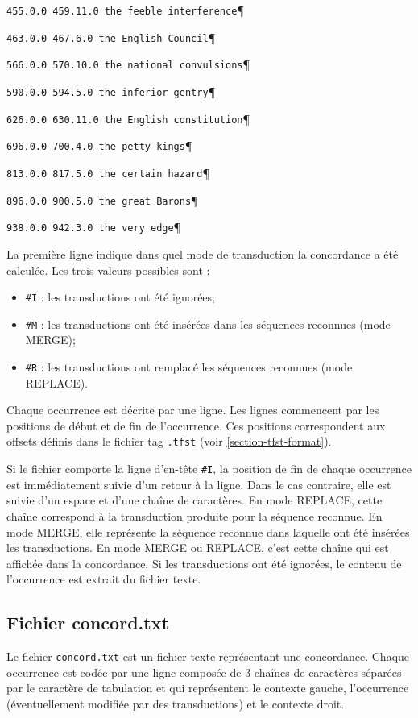 \verb$455.0.0 459.11.0 the feeble interference$\P

\verb$463.0.0 467.6.0 the English Council$\P

\verb$566.0.0 570.10.0 the national convulsions$\P

\verb$590.0.0 594.5.0 the inferior gentry$\P

\verb$626.0.0 630.11.0 the English constitution$\P

\verb$696.0.0 700.4.0 the petty kings$\P

\verb$813.0.0 817.5.0 the certain hazard$\P

\verb$896.0.0 900.5.0 the great Barons$\P

\verb$938.0.0 942.3.0 the very edge$\P

\bigskip
\noindent La première ligne indique dans quel mode de transduction la concordance a été calculée.
Les trois valeurs possibles sont :

\begin{itemize}
  \item \verb+#I+ : les transductions ont été ignorées;

  \item \verb+#M+ : les transductions ont été insérées dans les séquences reconnues (mode MERGE);
  
  \item \verb+#R+ : les transductions ont remplacé les séquences reconnues (mode REPLACE).
\end{itemize}

\bigskip
\noindent Chaque occurrence est décrite par une ligne. Les lignes commencent par les positions de
début et de fin de l’occurrence. Ces positions correspondent aux offsets
définis dans le fichier tag \verb$.tfst$  (voir \ref{section-tfst-format}).

\bigskip
\noindent Si le fichier comporte la ligne d’en-tête \verb+#I+, la position de fin de chaque
occurrence est immédiatement suivie d’un retour à la ligne. Dans le cas contraire, elle est suivie
d’un espace et d’une chaîne de caractères. En mode REPLACE, cette chaîne correspond à la
transduction produite pour la séquence reconnue. En mode MERGE, elle représente la séquence reconnue
dans laquelle ont été insérées les transductions. En mode MERGE ou REPLACE, c’est cette chaîne qui
est affichée dans la concordance. Si les transductions ont été ignorées, le contenu de l’occurrence
est extrait du fichier texte.



\subsection{Fichier concord.txt}
Le fichier \verb+concord.txt+ est un fichier texte représentant une concordance. Chaque occurrence
est codée par une ligne composée de 3 chaînes de caractères séparées par le caractère de tabulation
et qui représentent le contexte gauche, l’occurrence (éventuellement
modifiée par des transductions) et le contexte droit.




